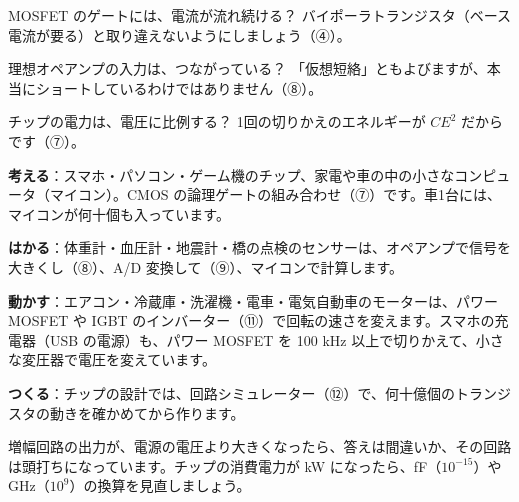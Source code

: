 \begin{tsumazuki}{MOSFET のゲートには、電流が流れ続ける？}
バイポーラトランジスタ（ベース電流が要る）と取り違えないようにしましょう（④）。
\end{tsumazuki}

\begin{tsumazuki}{理想オペアンプの入力は、つながっている？}
「仮想短絡」ともよびますが、本当にショートしているわけではありません（⑧）。
\end{tsumazuki}

\begin{tsumazuki}{チップの電力は、電圧に比例する？}
1回の切りかえのエネルギーが $CE^2$ だからです（⑦）。
\end{tsumazuki}

\begin{phkougaku}[スイッチと増幅で動く機械]
\textbf{考える}：スマホ・パソコン・ゲーム機のチップ、家電や車の中の小さなコンピュータ（マイコン）。CMOS の論理ゲートの組み合わせ（⑦）です。車1台には、マイコンが何十個も入っています。

\textbf{はかる}：体重計・血圧計・地震計・橋の点検のセンサーは、オペアンプで信号を大きくし（⑧）、A/D 変換して（⑨）、マイコンで計算します。

\textbf{動かす}：エアコン・冷蔵庫・洗濯機・電車・電気自動車のモーターは、パワー MOSFET や IGBT のインバーター（⑪）で回転の速さを変えます。スマホの充電器（USB の電源）も、パワー MOSFET を 100 kHz 以上で切りかえて、小さな変圧器で電圧を変えています。

\textbf{つくる}：チップの設計では、回路シミュレーター（⑫）で、何十億個のトランジスタの動きを確かめてから作ります。

\begin{phketa}[電子回路の数の目安]
増幅回路の出力が、電源の電圧より大きくなったら、答えは間違いか、その回路は頭打ちになっています。チップの消費電力が kW になったら、fF（$10^{-15}$）や GHz（$10^9$）の換算を見直しましょう。
\end{phketa}
\end{phkougaku}

